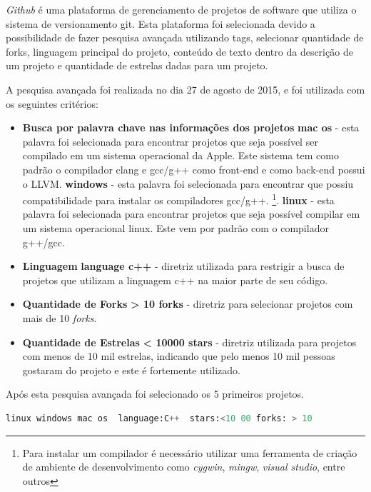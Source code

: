 \textit{Github} é uma plataforma de gerenciamento de projetos de software que
utiliza o sistema de versionamento git. Esta plataforma foi selecionada devido a
 possibilidade de fazer pesquisa avançada utilizando tags, selecionar quantidade de forks,
 linguagem principal do projeto, conteúdo de texto dentro da descrição de um projeto e
 quantidade de estrelas dadas para um projeto.


A pesquisa avançada foi realizada no dia 27 de agosto de 2015, e foi utilizada
 com os seguintes critérios:

\begin{itemize}
    \item \textbf{Busca por palavra chave nas informações dos projetos}
        \subitem \textbf{mac os} - esta palavra foi selecionada para encontrar projetos
 que seja possível ser compilado em um sistema operacional da Apple. Este sistema tem
 como padrão o compilador clang e gcc/g++ como front-end  e como back-end possui o LLVM.
        \subitem \textbf{windows} - esta palavra foi selecionada para encontrar 
 que possiu compatibilidade para instalar os compiladores gcc/g++.
\footnote{Para instalar um compilador é necessário utilizar uma ferramenta de criação de ambiente de desenvolvimento como \textit{cygwin}, \textit{mingw}, \textit{visual studio}, entre outros}.
        \subitem \textbf{linux} - esta palavra foi selecionada para encontrar projetos
 que seja possível compilar em um sistema operacional linux. Este vem por padrão com
 o compilador g++/gcc.
    \item \textbf{Linguagem}
        \subitem \textbf{language c++} - diretriz utilizada para restrigir a busca de 
projetos que utilizam a linguagem c++ na maior parte de seu código.
    \item \textbf{Quantidade de Forks}
        \subitem \textbf{ > 10 forks} - diretriz para selecionar projetos com
 mais de 10 \textit{forks}.
    \item \textbf{Quantidade de Estrelas}
        \subitem \textbf{ < 10000 stars } - diretriz utilizada para projetos com menos
 de 10 mil estrelas, indicando que pelo menos 10 mil pessoas gostaram do projeto e este
é fortemente utilizado. 
\end{itemize}

Após esta pesquisa avançada foi selecionado os 5 primeiros projetos.


\begin{lstlisting}[language=python, caption={Busca avançada github },
                  label=busca_avanacada_github]
     linux windows mac os  language:C++  stars:<10 00 forks: > 10
\end{lstlisting}


